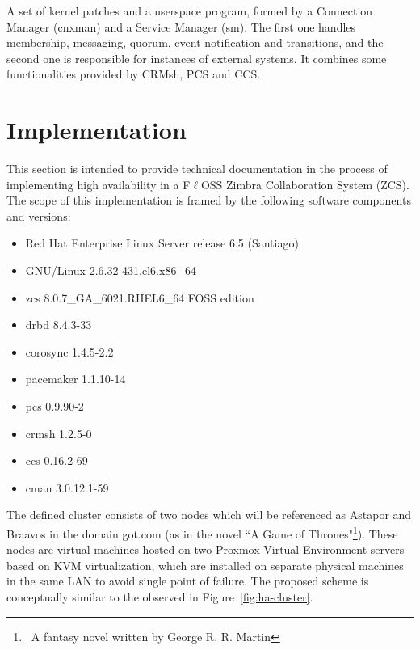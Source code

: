 \documentclass[a4paper, 12pt]{book}
\begin{document}
\noindent A set of kernel patches and a userspace program, formed by a Connection Manager (cnxman) and a Service Manager (sm). The first one handles membership, messaging, quorum, event notification and transitions, and the second one is responsible for instances of external systems. It combines some functionalities provided by CRMsh, PCS and CCS.


%
\chapter{Implementation}
\label{chap:implementation}

This section is intended to provide technical documentation in the process of implementing high availability in a F$\ell$OSS Zimbra Collaboration System (ZCS). The scope of this implementation is framed by the following software components and versions:

\begin{itemize}
	\setlength{\itemsep}{0pt}
	\item Red Hat Enterprise Linux Server release 6.5 (Santiago)
	\item GNU/Linux 2.6.32-431.el6.x86\_64
	\item zcs 8.0.7\_GA\_6021.RHEL6\_64 FOSS edition
	\item drbd 8.4.3-33
	\item corosync 1.4.5-2.2
	\item pacemaker 1.1.10-14
	\item pcs 0.9.90-2
	\item crmsh 1.2.5-0
	\item ccs 0.16.2-69
	\item cman 3.0.12.1-59
\end{itemize}

\noindent The defined cluster consists of two nodes which will be referenced as Astapor and Braavos in the domain got.com (as in the novel ``A Game of Thrones"\footnote{\tiny\ {A fantasy novel written by George R. R. Martin}}). These nodes are virtual machines hosted on two Proxmox Virtual Environment servers based on KVM virtualization, which are installed on separate physical machines in the same LAN to avoid single point of failure. The proposed scheme is conceptually similar to the observed in Figure~\ref{fig:ha-cluster}.
\end{document}
